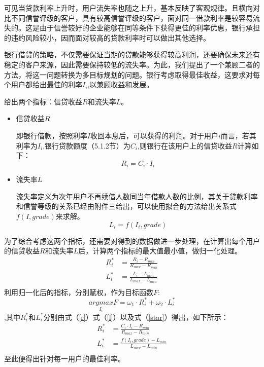 \documentclass{my_paper}
\begin{document}
可见当贷款利率上升时，用户流失率也随之上升，基本反映了客观规律。且横向对比不同信誉评级的客户，具有较高信誉评级的客户，面对同一借款利率是较容易流失的。这是由于信誉较好的企业能够在同等条件下获得更佳的利率优惠，银行承担的违约风险较小，因而面对较高的贷款利率时可以做出其他选择。

银行借贷的策略，不仅需要保证当期的贷款能够获得较高利润，还要确保未来还有稳定的客户来源，因此需要保持较低的流失率。为此，我们提出了一个兼顾二者的方法，将这一问题转换为多目标规划的问题。银行考虑取得最佳收益，这要求对每个用户都给出最佳的利率$I_i$,以兼顾收益和发展。

给出两个指标：信贷收益$R$和流失率$L$。
\begin{itemize}
    \item 信贷收益$R$
    
    即银行借款，按照利率$I$收回本息后，可以获得的利润。对于用户$i$而言，若其利率为$I_i$,银行贷款额度（5.1.2节）为$C_i$,则银行在该用户上的信贷收益$R$计算如下：
    \begin{equation}
    R_i = C_i\cdot I_i
    \label{r}
    \end{equation}
    \item 流失率$L$
    
    流失率定义为次年用户不再续借人数同当年借款人数的比例，其关于贷款利率和信誉等级的关系已经由附件三给出，可以使用拟合的方法给出关系式$f(I,grade)$来求解。
    \begin{equation}
    L_i = f(I_i,grade)
    \label{l}
    \end{equation}
\end{itemize}

为了综合考虑这两个指标，还需要对得到的数据做进一步处理，在计算出每个用户的信贷收益$R$和流失率$L$后，计算两个指标的最大值最小值，做归一化处理。
\begin{equation}
\begin{aligned}
    R_i^* &= \frac{R_i-R_{min}}{R_{max}-R_{min}} \\
    L_i^* &= \frac{L_i-L_{min}}{L_{max}-L_{min}} \\
\end{aligned}
\label{star}
\end{equation}
利用归一化后的指标，分别赋权，作为目标函数$F$:
\begin{equation}
\underset{I_i}{argmax}F = \omega_1 \cdot R_i^*+\omega_2 \cdot L_i^*
\label{}
\end{equation}
,其中$R_i^*$和$L_i^*$分别由式（\ref{r}）式（\ref{l}）以及式（\ref{star}）得出，如下所示：
\begin{equation}
\begin{aligned}
    R_i^* &= \frac{C_i\cdot I_i-R_{min}}{R_{max}-R_{min}} \\
    L_i^* &= \frac{f(I_i,grade)-L_{min}}{L_{max}-L_{min}} \\
\end{aligned}
\label{}
\end{equation}
至此便得出针对每一用户的最佳利率。
\end{document}
